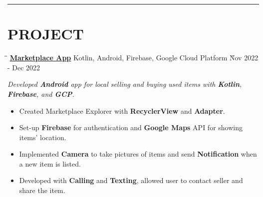\documentclass{res}
\begin{document}
\begin{resume}
\vspace{+0.05in}

\vspace{-12pt}
\hspace{-0.55in}
\noindent\rule[0.25\baselineskip]{19.36cm}{0.5pt}    
        
\vspace{-0.2in}
\section{PROJECT}

    \vspace{0.00in}	 
    \begin{tabbing}
    \hspace{2.391in}\= \hspace{3in}\= \kill %
    \href{https://github.com/DolorHunter/Marketplace}{\bf Marketplace App}  \> 
                Kotlin, Android, Firebase, Google Cloud Platform \` Nov 2022 - Dec 2022 \\
    \end{tabbing}\vspace{-20pt}      %
    \vspace{-0.1in}
    \textit{Developed {\bf Android} app for local selling and buying used items with {\bf Kotlin}, 
                {\bf Firebase}, and {\bf GCP}.}
    \vspace{+0.05in}
    \begin{itemize} \itemsep 1.5pt %
        \item Created Marketplace Explorer with {\bf RecyclerView} and {\bf Adapter}.
        \item Set-up {\bf Firebase} for authentication and {\bf Google Maps} API for showing items' location.
        \item Implemented {\bf Camera} to take pictures of items and send {\bf Notification} when a new item is listed.
        \item Developed with {\bf Calling} and {\bf Texting}, allowed user to contact seller and share the item.
    \end{itemize}


\end{resume}
\end{document}
